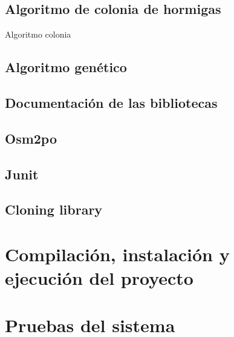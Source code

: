 \subsection{Algoritmo de colonia de hormigas}
Algoritmo colonia
\subsection{Algoritmo genético}

\subsection{Documentación de las bibliotecas}
\subsection{Osm2po}
\subsection{Junit}
\subsection{Cloning library}
\section{Compilación, instalación y ejecución del proyecto}
\section{Pruebas del sistema}
